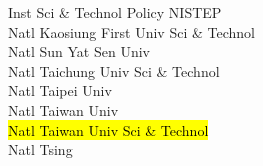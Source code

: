 \documentclass[a4paper]{article}
\begin{document}
\begin{multicols*}{2}
\begin{footnotesize}
 Inst Sci \& Technol Policy NISTEP \\ Natl Kaosiung First Univ Sci \& Technol \\ Natl Sun Yat Sen Univ \\ Natl Taichung Univ Sci \& Technol \\ Natl Taipei Univ \\ Natl Taiwan Univ \\ \hl{Natl Taiwan Univ Sci \& Technol} \\ Natl Tsing
\end{footnotesize}
\end{multicols*}
\end{document}
